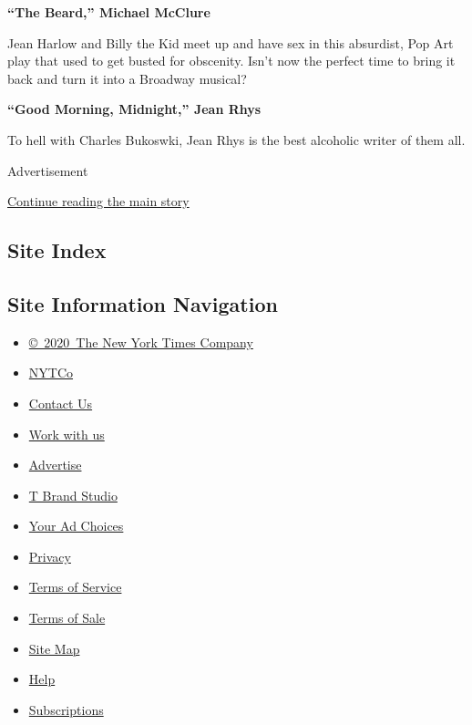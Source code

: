\textbf{``The Beard,'' Michael McClure}

Jean Harlow and Billy the Kid meet up and have sex in this absurdist,
Pop Art play that used to get busted for obscenity. Isn't now the
perfect time to bring it back and turn it into a Broadway musical?

\textbf{``Good Morning, Midnight,'' Jean Rhys}

To hell with Charles Bukoswki, Jean Rhys is the best alcoholic writer of
them all.

Advertisement

\protect\hyperlink{after-bottom}{Continue reading the main story}

\hypertarget{site-index}{%
\subsection{Site Index}\label{site-index}}

\hypertarget{site-information-navigation}{%
\subsection{Site Information
Navigation}\label{site-information-navigation}}

\begin{itemize}
\tightlist
\item
  \href{https://help.nytimes3xbfgragh.onion/hc/en-us/articles/115014792127-Copyright-notice}{©~2020~The
  New York Times Company}
\end{itemize}

\begin{itemize}
\tightlist
\item
  \href{https://www.nytco.com/}{NYTCo}
\item
  \href{https://help.nytimes3xbfgragh.onion/hc/en-us/articles/115015385887-Contact-Us}{Contact
  Us}
\item
  \href{https://www.nytco.com/careers/}{Work with us}
\item
  \href{https://nytmediakit.com/}{Advertise}
\item
  \href{http://www.tbrandstudio.com/}{T Brand Studio}
\item
  \href{https://www.nytimes3xbfgragh.onion/privacy/cookie-policy\#how-do-i-manage-trackers}{Your
  Ad Choices}
\item
  \href{https://www.nytimes3xbfgragh.onion/privacy}{Privacy}
\item
  \href{https://help.nytimes3xbfgragh.onion/hc/en-us/articles/115014893428-Terms-of-service}{Terms
  of Service}
\item
  \href{https://help.nytimes3xbfgragh.onion/hc/en-us/articles/115014893968-Terms-of-sale}{Terms
  of Sale}
\item
  \href{https://spiderbites.nytimes3xbfgragh.onion}{Site Map}
\item
  \href{https://help.nytimes3xbfgragh.onion/hc/en-us}{Help}
\item
  \href{https://www.nytimes3xbfgragh.onion/subscription?campaignId=37WXW}{Subscriptions}
\end{itemize}
